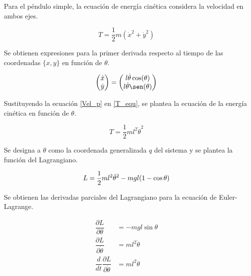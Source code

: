 Para el péndulo simple, la ecuación de energía cinética considera
la velocidad en ambos ejes.

\begin{equation} 
T = \frac{1}{2}m(\dot{x}^2 + \dot{y}^2) 
\label{T_equ}
\end{equation}

Se obtienen expresiones para la primer derivada respecto al tiempo de 
las coordenadas $\{x, y\}$ en función de $\theta$.

\begin{equation} 
\begin{pmatrix}
\dot{x}\\
\dot{y}
\end{pmatrix}
= 
\begin{pmatrix}
l\dot{\theta}\cos(\theta)\\
l\dot{\theta}\sen(\theta)
\end{pmatrix}
\label{Vel_p}
\end{equation}


Sustituyendo la ecuación \ref{Vel_p} en \ref{T_equ}, 
se plantea la ecuación de la energía cinética en función de $\theta$.

\begin{equation}
T = \frac{1}{2}ml^2\dot{\theta}^2
\end{equation}


Se designa a $\theta$ como la coordenada generalizada $q$ del sistema y
se plantea la función del Lagrangiano.


\begin{equation}
   L = \dfrac{1}{2}m l^2 \dot{\theta}^2 - m g l (1 - \cos{\theta})\\
 \label{eq: pendulum lagrangian}
\end{equation}

Se obtienen las derivadas parciales del Lagrangiano para la ecuación de 
Euler-Lagrange.

\begin{equation}
\begin{split}
  \dfrac{\partial L}{\partial \theta} &= - m g l \sin{\theta} \\
  \dfrac{\partial L}{\partial \dot{\theta}} &= m l ^2 \dot{\theta}\\
  \dfrac{d}{dt}\dfrac{\partial L}{\partial \dot{\theta}} &= ml^2\ddot{\theta}\\
  \end{split}
 \label{eq: partial derivatives lagrangian}
\end{equation}


